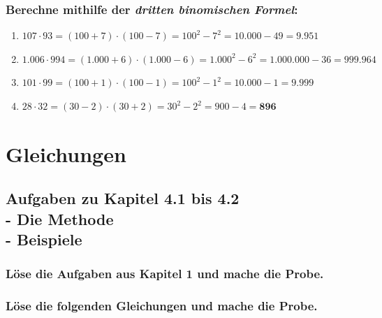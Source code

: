 \documentclass[a4paper,10pt]{article} %
\begin{document}
\subsubsection{Berechne mithilfe der \textit{dritten binomischen Formel}:} %

\begin{enumerate}[label=\alph*)]

  \item \(107 \cdot 93 =
    (100 + 7) \cdot (100 - 7) =
    100^2 - 7^2 =
    10.000 - 49 =
    \mathbf{9.951}\) %

  \item \(1.006 \cdot 994 =
    (1.000 + 6) \cdot (1.000 - 6) =
    1.000^2 - 6^2 =
    1.000.000 - 36 =
    \mathbf{999.964}\) %

  \item \(101 \cdot 99 =
    (100 + 1) \cdot (100 - 1) =
    100^2 - 1^2 =
    10.000 - 1 =
    \mathbf{9.999}\) %

  \item \(28 \cdot 32 =
    (30 - 2) \cdot (30 + 2) =
    30^2 - 2^2 =
    900 - 4 =
    \mathbf{896}\) %

\end{enumerate}

\section{Gleichungen}

\subsection{Aufgaben zu Kapitel 4.1 bis 4.2 \\
- Die Methode \\
- Beispiele}

\subsubsection{Löse die Aufgaben aus Kapitel 1 und mache die Probe.} %

\subsubsection{Löse die folgenden Gleichungen und mache die Probe.} %
\end{document}
